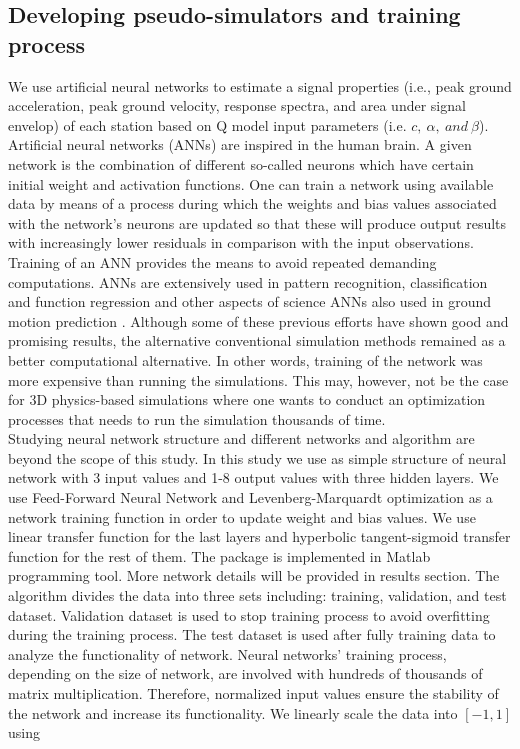 \subsection{Developing pseudo-simulators and training process}

We use artificial neural networks to estimate a signal properties (i.e., peak ground acceleration, peak ground velocity, response spectra, and area under signal envelop) of each station based on Q model input parameters (i.e. $c,~\alpha,~and~\beta$). Artificial neural networks (ANNs) are inspired in the human brain. A given network is the combination of different so-called neurons which have certain initial weight and activation functions. One can train a network using available data by means of a process during which the weights and bias values associated with the network's neurons are updated so that these will produce output results with increasingly lower residuals in comparison with the input observations.  Training of an ANN provides the means to avoid repeated demanding computations. ANNs are extensively used in pattern recognition, classification and function regression and other aspects of science \citep[][.] {Hinton2012deep,Baughman2014neural,Graves2013speech,Dahl2012context,Toshev2014deeppose}
ANNs also used in  ground motion prediction \citep{Hong2012observations,Ghaffarzadeh2013neural,paolucci2018broad}. Although some of these previous efforts have shown good and promising results, the alternative conventional simulation methods remained as a better computational alternative. In other words, training of the network was more expensive than running the simulations. This may, however, not be the case for 3D physics-based simulations where one wants to conduct an optimization processes that needs to run the simulation thousands of time.\\
Studying neural network structure and different networks and algorithm are beyond the scope of this study.  In this study we use as simple structure of neural network with 3 input values and 1-8 output values with three hidden layers. We use Feed-Forward Neural Network and Levenberg-Marquardt optimization as a network training function in order to update weight and bias values. We use linear transfer function for the last layers and hyperbolic tangent-sigmoid transfer function for the rest of them. The package is implemented in Matlab programming tool. More network details will be provided in results section. The algorithm divides the data into three sets including: training, validation, and test dataset. Validation dataset is used to stop training process to avoid overfitting during the training process. The test dataset is used after fully training data to analyze the functionality of network. Neural networks' training process, depending on the size of network, are involved with hundreds of thousands of matrix multiplication. Therefore, normalized input values ensure the stability of the network and increase its functionality. We linearly scale the data into $[-1,1]$ using

